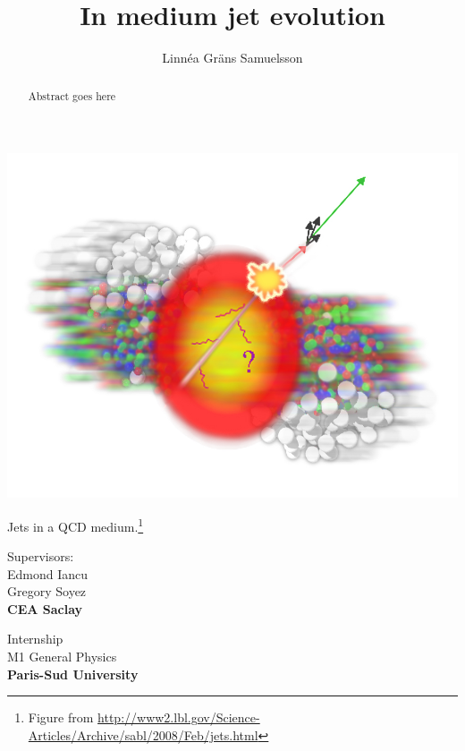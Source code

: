 \documentclass[a4paper,12pt]{article}
\numberwithin{equation}{section}
\begin{document}
\author{Linnéa Gräns Samuelsson}
\title{In medium jet evolution}

\begin{titlepage}
\maketitle 
\thispagestyle{fancy}
\renewcommand{\headrulewidth}{0pt}

\begin{abstract}
Abstract goes here
\end{abstract}


\vspace*{5cm}

\begin{center}
\includegraphics[width=0.5\linewidth]{jet-quenching.jpg}


\small{Jets in a QCD medium.\footnote{Figure from \url{http://www2.lbl.gov/Science-Articles/Archive/sabl/2008/Feb/jets.html}}}
\end{center}


\vspace*{1cm}
\begin{minipage}{0.45\linewidth}
\begin{flushleft}   
Supervisors:\\Edmond Iancu\\Gregory Soyez\\{\bf CEA Saclay}
\end{flushleft}   
\end{minipage}
\begin{minipage}{0.45\linewidth}
\begin{flushright}
Internship\\M1 General Physics\\{\bf Paris-Sud University}
\end{flushright}
\end{minipage}

\end{titlepage}
\end{document}
